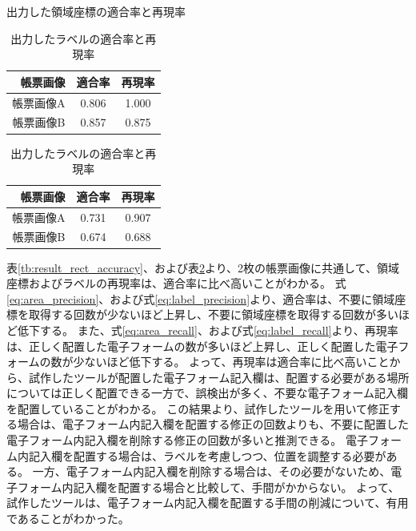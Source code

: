 \begin{table}[tp]
    \centering
    \begin{minipage}[h]{0.47\linewidth}
        \caption{出力した領域座標の適合率と再現率}
        \label{tb:result_rect_accuracy}
        \centering
        \begin{tabular}{r|c|c}
            帳票画像 & 適合率 & 再現率 \\
            \hline \hline
            帳票画像A & 0.806 & 1.000 \\
            帳票画像B & 0.857 & 0.875 \\
        \end{tabular}
    \end{minipage}
    \begin{minipage}[h]{0.47\linewidth}
        \caption{出力したラベルの適合率と再現率}
        \label{tb:result_label_accuracy}
        \centering
        \begin{tabular}{r|c|c}
            帳票画像 & 適合率 & 再現率 \\
            \hline \hline
            帳票画像A & 0.731 & 0.907 \\
            帳票画像B & 0.674 & 0.688 \\
        \end{tabular}
    \end{minipage}
\end{table}

表\ref{tb:result_rect_accuracy}、および表\ref{tb:result_label_accuracy}より、2枚の帳票画像に共通して、領域座標およびラベルの再現率は、適合率に比べ高いことがわかる。
式\ref{eq:area_precision}、および式\ref{eq:label_precision}より、適合率は、不要に領域座標を取得する回数が少ないほど上昇し、不要に領域座標を取得する回数が多いほど低下する。
また、式\ref{eq:area_recall}、および式\ref{eq:label_recall}より、再現率は、正しく配置した電子フォームの数が多いほど上昇し、正しく配置した電子フォームの数が少ないほど低下する。
よって、再現率は適合率に比べ高いことから、試作したツールが配置した電子フォーム記入欄は、配置する必要がある場所については正しく配置できる一方で、誤検出が多く、不要な電子フォーム記入欄を配置していることがわかる。
この結果より、試作したツールを用いて修正する場合は、電子フォーム内記入欄を配置する修正の回数よりも、不要に配置した電子フォーム内記入欄を削除する修正の回数が多いと推測できる。
電子フォーム内記入欄を配置する場合は、ラベルを考慮しつつ、位置を調整する必要がある。
一方、電子フォーム内記入欄を削除する場合は、その必要がないため、電子フォーム内記入欄を配置する場合と比較して、手間がかからない。
よって、試作したツールは、電子フォーム内記入欄を配置する手間の削減について、有用であることがわかった。

